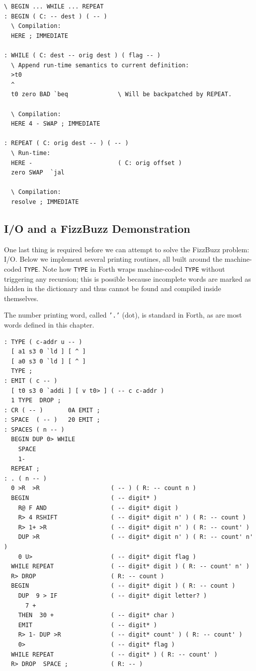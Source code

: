 \documentclass[a4paper,12pt,final]{article}
\begin{document}
\fontsize{9pt}{9.000000pt}\selectfont
\begin{verbatim}
\ BEGIN ... WHILE ... REPEAT
: BEGIN ( C: -- dest ) ( -- )
  \ Compilation:
  HERE ; IMMEDIATE

: WHILE ( C: dest -- orig dest ) ( flag -- )
  \ Append run-time semantics to current definition:
  >t0
  ^
  t0 zero BAD `beq              \ Will be backpatched by REPEAT.

  \ Compilation:
  HERE 4 - SWAP ; IMMEDIATE

: REPEAT ( C: orig dest -- ) ( -- )
  \ Run-time:
  HERE -                        ( C: orig offset )
  zero SWAP  `jal

  \ Compilation:
  resolve ; IMMEDIATE
\end{verbatim}
\normalsize


\subsection{I/O and a FizzBuzz Demonstration}
\label{sec:org38649f3}

One last thing is required before we can attempt to solve the FizzBuzz
problem: I/O.  Below we implement several printing routines, all built
around the machine-coded \texttt{TYPE}.  Note how \texttt{TYPE} in Forth wraps
machine-coded \texttt{TYPE} without triggering any recursion; this is
possible because incomplete words are marked as hidden in the
dictionary and thus cannot be found and compiled inside themselves.

The number printing word, called \texttt{'.'} (dot), is standard in Forth, as
are most words defined in this chapter.

\fontsize{9pt}{9.000000pt}\selectfont
\begin{verbatim}
: TYPE ( c-addr u -- )
  [ a1 s3 0 `ld ] [ ^ ]
  [ a0 s3 0 `ld ] [ ^ ]
  TYPE ;
: EMIT ( c -- )
  [ t0 s3 0 `addi ] [ v t0> ] ( -- c c-addr )
  1 TYPE  DROP ;
: CR ( -- )       0A EMIT ;
: SPACE  ( -- )   20 EMIT ;
: SPACES ( n -- )
  BEGIN DUP 0> WHILE
    SPACE
    1-
  REPEAT ;
: . ( n -- )
  0 >R  >R                    ( -- ) ( R: -- count n )
  BEGIN                       ( -- digit* )
    R@ F AND                  ( -- digit* digit )
    R> 4 RSHIFT               ( -- digit* digit n' ) ( R: -- count )
    R> 1+ >R                  ( -- digit* digit n' ) ( R: -- count' )
    DUP >R                    ( -- digit* digit n' ) ( R: -- count' n' )
    0 U>                      ( -- digit* digit flag )
  WHILE REPEAT                ( -- digit* digit ) ( R: -- count' n' )
  R> DROP                     ( R: -- count )
  BEGIN                       ( -- digit* digit ) ( R: -- count )
    DUP  9 > IF               ( -- digit* digit letter? )
      7 +
    THEN  30 +                ( -- digit* char )
    EMIT                      ( -- digit* )
    R> 1- DUP >R              ( -- digit* count' ) ( R: -- count' )
    0>                        ( -- digit* flag )
  WHILE REPEAT                ( -- digit* ) ( R: -- count' )
  R> DROP  SPACE ;            ( R: -- )
\end{verbatim}
\normalsize
\end{document}
